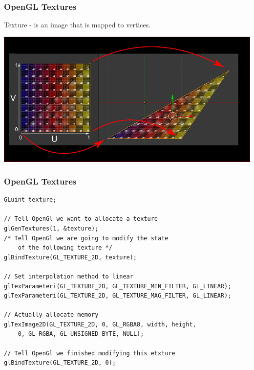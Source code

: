 \begin{frame}[fragile]

\frametitle{OpenGL Textures}

Texture - is an image that is mapped to vertices.

\begin{center}
\includegraphics[width=\textwidth]{images/uv.png}
\end{center}

\end{frame}


\begin{frame}[fragile]

\frametitle{OpenGL Textures}

\begin{lstlisting}[basicstyle=\fontsize{7pt}{8pt}\ttfamily]
GLuint texture;

// Tell OpenGl we want to allocate a texture
glGenTextures(1, &texture);
/* Tell OpenGl we are going to modify the state
    of the following texture */
glBindTexture(GL_TEXTURE_2D, texture);

// Set interpolation method to linear
glTexParameteri(GL_TEXTURE_2D, GL_TEXTURE_MIN_FILTER, GL_LINEAR);
glTexParameteri(GL_TEXTURE_2D, GL_TEXTURE_MAG_FILTER, GL_LINEAR);

// Actually allocate memory
glTexImage2D(GL_TEXTURE_2D, 0, GL_RGBA8, width, height,
    0, GL_RGBA, GL_UNSIGNED_BYTE, NULL);    

// Tell OpenGl we finished modifying this etxture
glBindTexture(GL_TEXTURE_2D, 0);
\end{lstlisting}


\end{frame}



